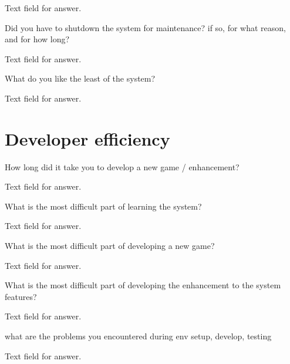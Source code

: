 Text field for answer.

\begin{question}
	\item Did you have to shutdown the system for maintenance? if so, for what reason, and for how long?
\end{question}

Text field for answer.

\begin{question}
	\item What do you like the least of the system?
\end{question}

Text field for answer.

\section{Developer efficiency}

\begin{question}
	\item How long did it take you to develop a new game / enhancement?
\end{question}

Text field for answer.

\begin{question}
	\item What is the most difficult part of learning the system?
\end{question}

Text field for answer.

\begin{question}
	\item What is the most difficult part of developing a new game?
\end{question}

Text field for answer.

\begin{question}
	\item What is the most difficult part of developing the enhancement to the system features?
\end{question}

Text field for answer.

\begin{question}
	\item what are the problems you encountered during env setup, develop, testing
\end{question}

Text field for answer.


